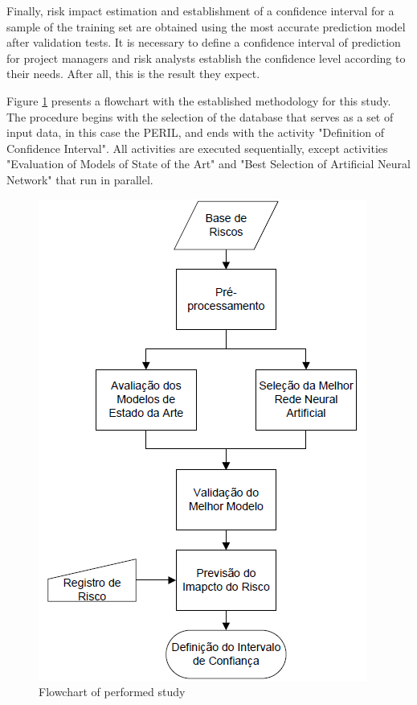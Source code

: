 Finally, risk impact estimation and establishment of a confidence interval for a sample of the training set are obtained using the most accurate prediction model after validation tests. It is necessary to define a confidence interval of prediction for project managers and risk analysts establish the confidence level according to their needs. After all, this is the result they expect.

Figure \ref{fig:method} presents a flowchart with the established methodology for this study. The procedure begins with the selection of the database that serves as a set of input data, in this case the PERIL, and ends with the activity "Definition of Confidence Interval". All activities are executed sequentially, except activities "Evaluation of Models of State of the Art" and "Best Selection of Artificial Neural Network" that run in parallel. 

\begin{figure}[h]
	\centering
	\includegraphics[width=.45\textwidth]{image/MetodologiaDissertacao.png}
	\caption{Flowchart of performed study}
	\label{fig:method}
\end{figure}

